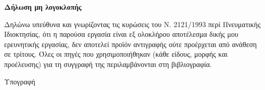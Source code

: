 \thispagestyle{empty}

{\bfseries Δήλωση μη λογοκλοπής}

\vspace{0.8cm}

Δηλώνω υπεύθυνα και γνωρίζοντας τις κυρώσεις του Ν. 2121/1993 περί Πνευματικής
Ιδιοκτησίας, ότι η παρούσα εργασία είναι εξ ολοκλήρου αποτέλεσμα δικής μου
ερευνητικής εργασίας, δεν αποτελεί προϊόν αντιγραφής ούτε προέρχεται από
ανάθεση σε τρίτους. Όλες οι πηγές που χρησιμοποιήθηκαν (κάθε είδους, μορφής και
προέλευσης) για τη συγγραφή της περιλαμβάνονται στη βιβλιογραφία.

\vspace{1.5cm}

\thesisauthorlatin

\vspace{1.5cm}

Υπογραφή

\clearpage
